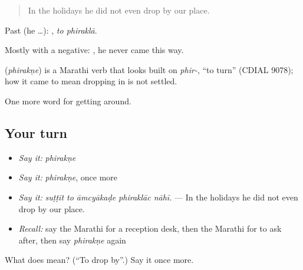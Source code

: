 \begin{quote}
In the holidays he did not even drop by our place.
\end{quote}

Past (he …):  , \emph{to phiraklā}.

Mostly with a negative:   , he never came this way.

\begin{cousinweb}
\textbf{} (\emph{phirakṇe}) is a Marathi verb that looks built on \emph{phir-}, \textquotedblleft{}to turn\textquotedblright{} (CDIAL 9078); how it came to mean dropping in is not settled.
\end{cousinweb}

\begin{grammarlens}[title={What you've built}]
One more word for getting around.
\end{grammarlens}

\subsection*{Your turn}
\begin{itemize}
\raggedright
  \item \emph{Say it:} \emph{phirakṇe}
  \item \emph{Say it:} \emph{phirakṇe}, once more
  \item \emph{Say it:} \emph{suṭṭīt to āmcyākaḍe phiraklāc nāhī.} — In the holidays he did not even drop by our place.
  \item \emph{Recall:} say the Marathi for a reception desk, then the Marathi for to ask after, then say \emph{phirakṇe} again
\end{itemize}

\begin{tcolorbox}[breakable,colback=teal!4,colframe=teal!35!black,title={Before you move on}]
What does  mean? (\textquotedblleft{}To drop by\textquotedblright{}.) Say it once more.
\end{tcolorbox}
